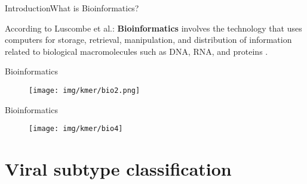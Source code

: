 \documentclass[10pt]{beamer}
\newcommand{\1}{
        	\setbeamertemplate{background}{
        		\texttt{[image: img/1]}
        		\tikz[overlay] \fill[fill opacity=0.75,fill=white] (0,0) rectangle (-\paperwidth,\paperheight);
        	}
}
\begin{document}
\begin{frame}{Introduction}{What is Bioinformatics?}
	
	According to Luscombe et al.: \textbf{Bioinformatics} involves the technology that uses computers for storage, retrieval, manipulation, and distribution of information related to biological macromolecules such as DNA, RNA, and proteins \cite{luscombe2001bioinformatics}.
	
\end{frame}


\begin{frame}{Bioinformatics}
	\begin{figure}[]
		\centering
		\texttt{[image: img/kmer/bio2.png]}
		\label{img:mot2}
	\end{figure}
\end{frame}

\begin{frame}{Bioinformatics}
	\begin{figure}[]
		\centering
		\texttt{[image: img/kmer/bio4]}
		\label{img:mot2}
	\end{figure}
\end{frame}




\section{Viral subtype classification}
\end{document}
